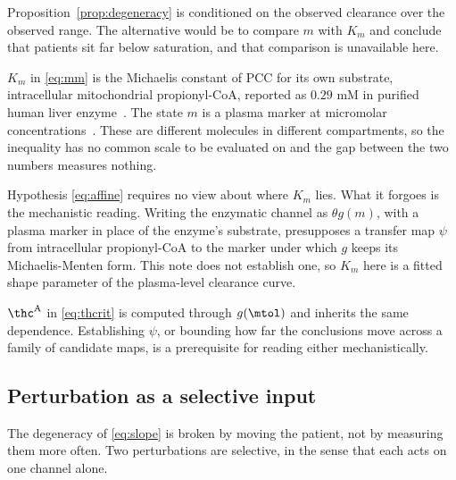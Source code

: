 \begin{remark}
\label{rem:no_km}
Proposition~\ref{prop:degeneracy} is conditioned on the observed clearance over the
observed range. The alternative would be to compare $m$ with $K_m$ and conclude that
patients sit far below saturation, and that comparison is unavailable here.

$K_m$ in \eqref{eq:mm} is the Michaelis constant of PCC for its own substrate,
intracellular mitochondrial propionyl-CoA, reported as $0.29$ mM in purified human liver
enzyme~\cite{pcc_liver_kinetics}. The state $m$ is a plasma marker at micromolar
concentrations~\cite{amd_phenotyping}. %
These are different molecules in different compartments, so the inequality has no common
scale to be evaluated on and the gap between the two numbers measures nothing.

Hypothesis \eqref{eq:affine} requires no view about where $K_m$ lies. What it forgoes is
the mechanistic reading. Writing the enzymatic channel as $\theta g(m)$, with a plasma
marker in place of the enzyme's substrate, presupposes a transfer map $\psi$ from
intracellular propionyl-CoA to the marker under which $g$ keeps its Michaelis-Menten form.
This note does not establish one, so $K_m$ here is a fitted shape parameter of the
plasma-level clearance curve.

$\thc^{\mathrm{A}}$ in \eqref{eq:thcrit} is computed through $g(\mtol)$ and inherits the same
dependence. Establishing $\psi$, or bounding how far the conclusions move across a family
of candidate maps, is a prerequisite for reading either mechanistically.
\end{remark}

\subsection{Perturbation as a selective input}
\label{sec:selective}

The degeneracy of \eqref{eq:slope} is broken by moving the patient, not by measuring them
more often. Two perturbations are selective, in the sense that each acts on one channel
alone.

